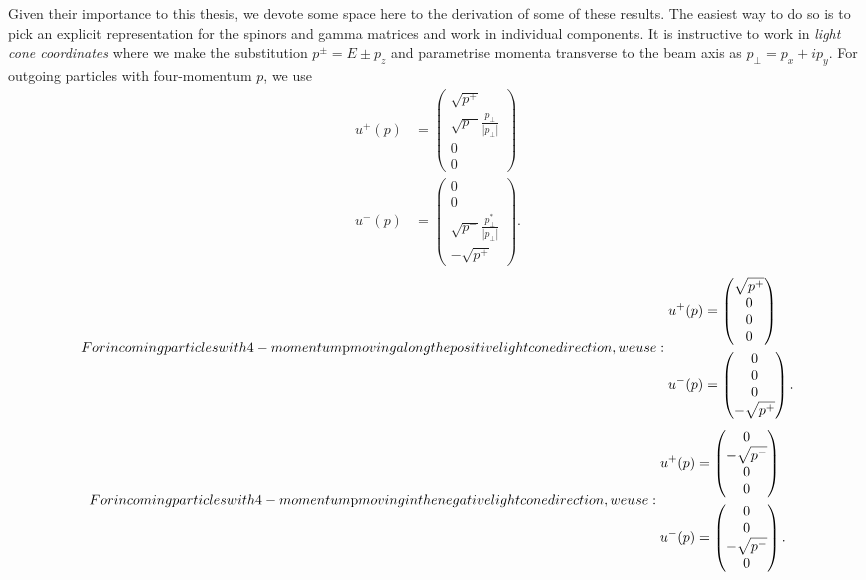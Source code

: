 Given their importance to this thesis, we devote some space here to the derivation of some of these results. The easiest way to do so is to pick an explicit representation for the spinors and gamma matrices and work in individual components. It is instructive to work in \emph{light cone coordinates} where we make the substitution $p^{\pm} = E \pm p_z$ and parametrise momenta transverse to the beam axis as $p_\perp = p_x + ip_y$. For outgoing particles with four-momentum $p$, we use
\begin{subequations}
\begin{align}
u^+(p) &= 
 \begin{pmatrix}
  \sqrt{p^+} \\
  \sqrt{p^-}\frac{p_{\perp}}{|p_{\perp}|}\\
  0 \\
  0
 \end{pmatrix}\\
 u^-(p) &= 
 \begin{pmatrix}
  0 \\
  0 \\
  \sqrt{p^-}\frac{p_{\perp}^*}{|p_{\perp}|} \\
  -\sqrt{p^+}
 \end{pmatrix}.
\end{align}
\end{subequations}
\begin{subequations}
For incoming particles with 4-momentum $p$ moving along the positive light cone direction, we use: 
\begin{align}
u^+(p) &= 
 \begin{pmatrix}
  \sqrt{p^+} \\
  0\\
  0 \\
  0
 \end{pmatrix}\\
 u^-(p) &= 
 \begin{pmatrix}
  0 \\
  0 \\
  0 \\
  -\sqrt{p^+}
 \end{pmatrix}.
\end{align}
\end{subequations}
\begin{subequations}
For incoming particles with 4-momentum $p$ moving in the negative light cone direction, we use:
\begin{align}
u^+(p) &= 
 \begin{pmatrix}
  0 \\
  -\sqrt{p^-}\\
  0 \\
  0
 \end{pmatrix}\\
 u^-(p) &= 
 \begin{pmatrix}
  0 \\
  0 \\
  -\sqrt{p^-} \\
  0
 \end{pmatrix}.
\end{align}
\end{subequations}

